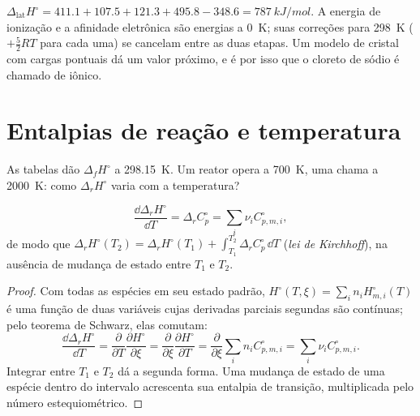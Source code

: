 \begin{example}\label{ex:b2:reaction-enthalpy:nacl}
$\Delta_{\text{lat}}H^\circ = 411.1 + 107.5 + 121.3 + 495.8 - 348.6 =
\qty{787}{kJ/mol}$. A energia de ionização e a afinidade eletrônica são
energias a \qty{0}{K}; suas correções para \qty{298}{K} ($+\tfrac52RT$
para cada uma) se cancelam entre as duas etapas. Um modelo de cristal com
cargas pontuais dá um valor próximo, e é por isso que o cloreto de sódio é
chamado de iônico.
\end{example}

\section{Entalpias de reação e temperatura}

As tabelas dão $\Delta_f H^\circ$ a \qty{298.15}{K}. Um reator opera a
\qty{700}{K}, uma chama a \qty{2000}{K}: como $\Delta_r H^\circ$ varia
com a temperatura?

\begin{theorem}\label{thm:b2:reaction-enthalpy:kirchhoff}
\[
  \frac{\dd\Delta_r H^\circ}{\dd T} = \Delta_r C_p^\circ =
  \sum_i\nu_i C_{p,m,i}^\circ ,
\]
de modo que $\Delta_r H^\circ(T_2) = \Delta_r H^\circ(T_1) + \int_{T_1}^{T_2}
\Delta_r C_p^\circ\,\dd T$ (\emph{lei de Kirchhoff}),
na ausência de mudança de estado entre $T_1$ e $T_2$.
\end{theorem}

\begin{proof}
Com todas as espécies em seu estado padrão, $H^\circ(T, \xi) = \sum_in_i
H^\circ_{m,i}(T)$ é uma função de duas variáveis cujas derivadas parciais
segundas são contínuas; pelo teorema de Schwarz, elas comutam:
\[
  \frac{\dd\Delta_r H^\circ}{\dd T} = \frac{\partial}{\partial T}
  \frac{\partial H^\circ}{\partial\xi} = \frac{\partial}{\partial\xi}
  \frac{\partial H^\circ}{\partial T} = \frac{\partial}{\partial\xi}
  \sum_in_iC^\circ_{p,m,i} = \sum_i\nu_iC^\circ_{p,m,i}.
\]
Integrar entre $T_1$ e $T_2$ dá a segunda forma. Uma mudança de estado
de uma espécie dentro do intervalo acrescenta sua entalpia de transição,
multiplicada pelo número estequiométrico.
\end{proof}

